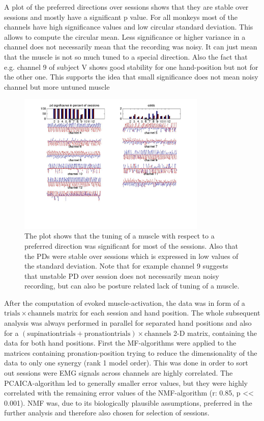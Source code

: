 A plot of the preferred directions over sessions shows that they are stable over sessions and mostly have a significant p value. For all monkeys most of the channels have high significance values and low circular standard deviation. This allows to compute the circular mean. Less significance or higher variance in a channel does not necessarily mean that the recording was noisy. It can just mean that the muscle is not so much tuned to a special direction. Also the fact that e.g. channel 9 of subject V shows good stability for one hand-position but not for the other one. This supports the idea that small significance does not mean noisy channel but more untuned muscle
\begin{figure}[ht]
    \centering
        \includegraphics[width=0.8\textwidth]{images/pd_consist_feather_allvega.jpg}
    \caption{The plot shows that the tuning of a muscle with respect to a preferred direction was significant for most of the sessions. Also that the PDs were stable over sessions which is expressed in low values of the standard deviation. Note that for example channel 9 suggests that unstable PD over session does not necessarily mean noisy recording, but can also be posture related lack of tuning of a muscle.}
    \label{sg:fig:images_pd_consist_feather_allvega}
\end{figure}


After the computation of evoked muscle-activation, the data was in form of a $\mathrm{trials} \times \mathrm{channels}$ matrix for each session and hand position. The whole subsequent analysis was always performed in parallel for separated hand positions and also for a $(\mathrm{supination trials} + \mathrm{pronation trials}) \times \mathrm{channels}$ 2-D matrix, containing the data for both hand positions. First the MF-algorithms were applied to the matrices containing pronation-position trying to reduce the dimensionality of the data to only one synergy (rank 1 model order). This was done in order to sort out sessions were EMG signals across channels are highly correlated. The PCAICA-algorithm led to generally smaller error values, but they were highly correlated with the remaining error values of the NMF-algorithm (r: 0.85, p << 0.001). NMF was, due to its biologically plausible assumptions, preferred in the further analysis and therefore also chosen for selection of sessions. 

